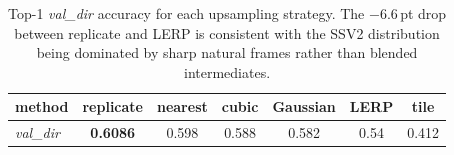 \documentclass[10pt,twocolumn,letterpaper]{article}
\begin{document}
\begin{table}[!ht]
  \centering
  \small
  \begin{tabular}{@{}lcccccc@{}}
    \toprule
    method
                    & replicate         & nearest & cubic & Gaussian & LERP & tile  \\
    \midrule
    \emph{val\_dir} & \textbf{0.6086}   & 0.598   & 0.588 & 0.582 & 0.54     & 0.412 \\
    \bottomrule
  \end{tabular}
  \caption{Top-1 \emph{val\_dir} accuracy for each upsampling strategy.
           The $-6.6$\,pt drop between replicate and LERP is consistent
           with the SSV2 distribution being dominated by sharp natural
           frames rather than blended intermediates.}
  \label{tab:upsampling}
\end{table}
\end{document}
